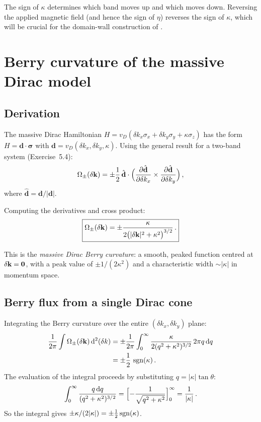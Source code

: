 The sign of $\kappa$ determines which band moves up and which moves
down.  Reversing the applied magnetic field (and hence the sign of
$\eta$) reverses the sign of $\kappa$, which will be crucial for the
domain-wall construction of .

\section{Berry curvature of the massive Dirac model}
\label{sec:ch7-berry-curvature}

\subsection{Derivation}
\label{sec:ch7-bc-derivation}

The massive Dirac Hamiltonian $H=v_D(\delta k_x\sigma_x
+\delta k_y\sigma_y+\kappa\sigma_z)$ has the form
$H=\mathbf{d}\cdot\boldsymbol{\sigma}$ with
$\mathbf{d}=v_D(\delta k_x,\delta k_y,\kappa)$.  Using the general
result for a two-band system (Exercise~5.4):
\begin{equation}\label{eq:ch7-bc-general}
  \Omega_\pm(\delta\mathbf{k})
  = \pm\frac{1}{2}\,\hat{\mathbf{d}}\cdot
  \Bigl(\frac{\partial \hat{\mathbf{d}}}{\partial \delta k_x}\times
        \frac{\partial \hat{\mathbf{d}}}{\partial \delta k_y}\Bigr)\,,
\end{equation}
where $\hat{\mathbf{d}}=\mathbf{d}/|\mathbf{d}|$.

Computing the derivatives and cross product:
\begin{equation}\label{eq:ch7-bc-result}
  \boxed{%
  \Omega_\pm(\delta\kvec)
  = \pm\frac{\kappa}{2\bigl(|\delta\kvec|^2+\kappa^2\bigr)^{3/2}}\,.}
\end{equation}

This is the \emph{massive Dirac Berry curvature}: a smooth, peaked
function centred at $\delta\mathbf{k}=\mathbf{0}$, with a peak value of
$\pm 1/(2\kappa^2)$ and a characteristic width $\sim|\kappa|$ in
momentum space.

\subsection{Berry flux from a single Dirac cone}
\label{sec:ch7-half-flux}

Integrating the Berry curvature over the entire $(\delta k_x,\delta k_y)$
plane:
\begin{align}\label{eq:ch7-half-chern}
  \frac{1}{2\pi}\int\Omega_\pm(\delta\mathbf{k})\,\mathrm{d}^2(\delta k)
  &= \pm\frac{1}{2\pi}\int_0^\infty
    \frac{\kappa}{2(q^2+\kappa^2)^{3/2}}\,2\pi q\,\mathrm{d} q
  \notag\\
  &= \pm\frac{1}{2}\,\operatorname{sgn}(\kappa)\,.
\end{align}
The evaluation of the integral proceeds by substituting $q=|\kappa|\tan\theta$:
\begin{equation}
  \int_0^\infty\frac{q\,\mathrm{d} q}{(q^2+\kappa^2)^{3/2}}
  = \Bigl[-\frac{1}{\sqrt{q^2+\kappa^2}}\Bigr]_0^\infty
  = \frac{1}{|\kappa|}\,.
\end{equation}
So the integral gives
$\pm\kappa/(2|\kappa|)=\pm\frac{1}{2}\operatorname{sgn}(\kappa)$.

